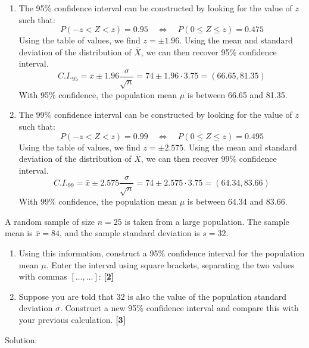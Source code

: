\documentclass[a4paper, leqno, 12pt]{article} %
\newenvironment{top_enumerate}{
\begin{enumerate}
  \setlength{\itemsep}{2em}
  \setlength{\topsep}{-0pt}
  \setlength{\partopsep}{-0pt}
}{\end{enumerate}}
\begin{document}
\begin{top_enumerate}
\begin{enumerate}
	The 90\% confidence interval can be constructed using the standard normal distribution, but looking for the value of $z$ such that:
	\[
	P(-z < Z < z) = 0.9 \quad \iff \quad P(0 \le Z \le z) = 0.45
	\]
	Using the table of values, we find $z = \pm 1.645$. Using the mean and standard deviation of the distribution of $\bar X$, we can then recover 90\% confidence interval.
	\[
	C.I._{90} = \bar x \pm 1.645 \frac{\sigma}{\sqrt{n}} = {74} \pm 1.645 \cdot {3.75} = ({67.83}, {80.17})
	\]
	With 90\% confidence, the population mean $\mu$ is between {67.83} and {80.17}.
	 \quad \textbf{}
		\item The 95\% confidence interval can be constructed by looking for the value of $z$ such that:
	\[
	P(-z < Z < z) = 0.95 \quad \iff \quad P(0 \le Z \le z) = 0.475
	\]
	Using the table of values, we find $z = \pm 1.96$. Using the mean and standard deviation of the distribution of $\bar X$, we can then recover 95\% confidence interval.
	\[
	C.I._{95} = \bar x \pm 1.96 \frac{\sigma}{\sqrt{n}} = {74} \pm 1.96 \cdot {3.75} = ({66.65}, {81.35})
	\]
	With 95\% confidence, the population mean $\mu$ is between {66.65} and {81.35}.
	 \quad \textbf{}
		\item The 99\% confidence interval can be constructed by looking for the value of $z$ such that:
	\[
	P(-z < Z < z) = 0.99 \quad \iff \quad P(0 \le Z \le z) = 0.495
	\]
	Using the table of values, we find $z = \pm 2.575$. Using the mean and standard deviation of the distribution of $\bar X$, we can then recover 99\% confidence interval.
	\[
	C.I._{99} = \bar x \pm 2.575 \frac{\sigma}{\sqrt{n}} = {74} \pm 2.575 \cdot {3.75} = ({64.34}, {83.66})
	\]
	With 99\% confidence, the population mean $\mu$ is between {64.34} and {83.66}.
	 \quad \textbf{}
\end{enumerate}\newpage
\item A random sample of size $n={25}$ is taken from a large population. The sample mean is $\bar x = {84}$, and the sample standard deviation is $s = {32}$.
 
\setcounter{equation}{0}  %
\begin{enumerate}
	\setlength{\topsep}{-0pt}
	\setlength{\partopsep}{-0pt}
	\setlength{\itemsep}{10pt}
			\item Using this information, construct a 95\% confidence interval for the population mean $\mu$. Enter the interval using square brackets, separating the two values with commas $\left[\dots ,\dots \right]$:
	 \quad \textbf{[2]}
		\item Suppose you are told that {32} is also the value of the population standard deviation $\sigma$. Construct a new 95\% confidence interval and compare this with your previous calculation.
	 \quad \textbf{[3]}
\end{enumerate}\addtocounter{enumi}{-1}
\item Solution:
 

\end{top_enumerate}
\end{document}
